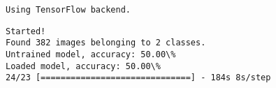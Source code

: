 \documentclass[11pt]{article}
\begin{document}
    \begin{Verbatim}[commandchars=\\\{\}]
Using TensorFlow backend.
    \end{Verbatim}

    \begin{Verbatim}[commandchars=\\\{\}]
Started!
Found 382 images belonging to 2 classes.
Untrained model, accuracy: 50.00\%
Loaded model, accuracy: 50.00\%
24/23 [==============================] - 184s 8s/step
    \end{Verbatim}

    \begin{center}
    \end{center}
    { \hspace*{\fill} \\}
    
\end{document}
